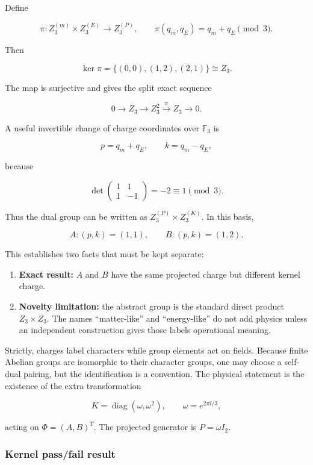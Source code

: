 \documentclass[
]{article}
\providecommand{\tightlist}{%
  \setlength{\itemsep}{0pt}\setlength{\parskip}{0pt}}
\begin{document}
Define

\[
\pi:Z_3^{(m)}\times Z_3^{(E)}\longrightarrow Z_3^{(P)},\qquad
\pi(q_m,q_E)=q_m+q_E\pmod 3.
\]

Then

\[
\ker\pi=\{(0,0),(1,2),(2,1)\}\cong Z_3.
\]

The map is surjective and gives the split exact sequence

\[
0\longrightarrow Z_3\longrightarrow Z_3^2
\overset{\pi}{\longrightarrow}Z_3\longrightarrow0.
\]

A useful invertible change of charge coordinates over \(\mathbb F_3\) is

\[
p=q_m+q_E,\qquad k=q_m-q_E,
\]

because

\[
\det\begin{pmatrix}1&1\\1&-1\end{pmatrix}=-2\equiv1\pmod3.
\]

Thus the dual group can be written as \(Z_3^{(P)}\times Z_3^{(K)}\). In
this basis,

\[
A:(p,k)=(1,1),\qquad B:(p,k)=(1,2).
\]

This establishes two facts that must be kept separate:

\begin{enumerate}
\def\labelenumi{\arabic{enumi}.}
\tightlist
\item
  \textbf{Exact result:} \(A\) and \(B\) have the same projected charge
  but different kernel charge.
\item
  \textbf{Novelty limitation:} the abstract group is the standard direct
  product \(Z_3\times Z_3\). The names ``matter-like'' and
  ``energy-like'' do not add physics unless an independent construction
  gives those labels operational meaning.
\end{enumerate}

Strictly, charges label characters while group elements act on fields.
Because finite Abelian groups are isomorphic to their character groups,
one may choose a self-dual pairing, but the identification is a
convention. The physical statement is the existence of the extra
transformation

\[
K=\operatorname{diag}(\omega,\omega^2),\qquad \omega=e^{2\pi i/3},
\]

acting on \(\Phi=(A,B)^T\). The projected generator is \(P=\omega I_2\).

\hypertarget{kernel-passfail-result}{%
\subsubsection{Kernel pass/fail result}\label{kernel-passfail-result}}
\end{document}
